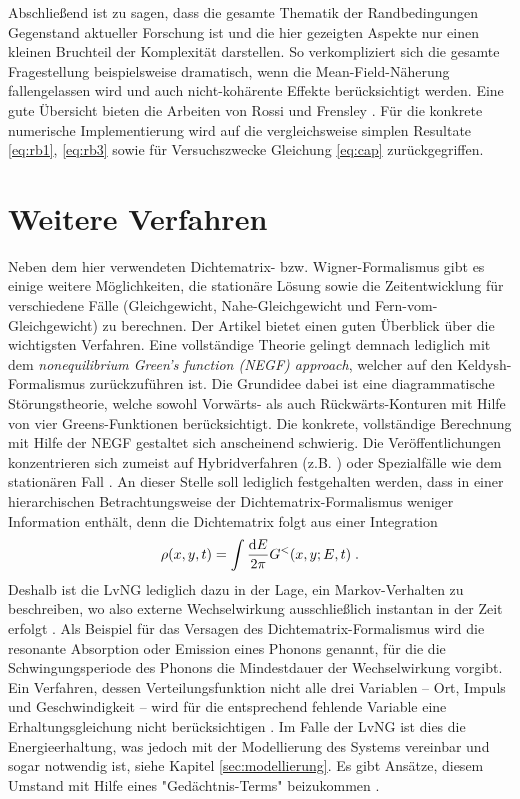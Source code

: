 Abschließend ist zu sagen, dass die gesamte Thematik der Randbedingungen Gegenstand aktueller Forschung ist und die hier gezeigten Aspekte nur einen kleinen Bruchteil der Komplexität darstellen. So verkompliziert sich die gesamte Fragestellung beispielsweise dramatisch, wenn die Mean-Field-Näherung fallengelassen wird und auch nicht-kohärente Effekte berücksichtigt werden. Eine gute Übersicht bieten die Arbeiten von Rossi \cite{buchRossi} und Frensley \cite{frensley}. Für die konkrete numerische Implementierung wird auf die vergleichsweise simplen Resultate \eqref{eq:rb1}, \eqref{eq:rb3} sowie für Versuchszwecke Gleichung \eqref{eq:cap} zurückgegriffen.

\section{Weitere Verfahren}\label{sec:weitere_verfahren}
Neben dem hier verwendeten Dichtematrix- bzw. Wigner-Formalismus gibt es einige weitere Möglichkeiten, die stationäre Lösung sowie die Zeitentwicklung für verschiedene Fälle (Gleichgewicht, Nahe-Gleichgewicht und Fern-vom-Gleichgewicht) zu berechnen. Der Artikel \cite{frensley3} bietet einen guten Überblick über die wichtigsten Verfahren. Eine vollständige Theorie gelingt demnach lediglich mit dem \emph{nonequilibrium Green's function (NEGF) approach}, welcher auf den Keldysh-Formalismus zurückzuführen ist. Die Grundidee dabei ist eine diagrammatische Störungstheorie, welche sowohl Vorwärts- als auch Rückwärts-Konturen mit Hilfe von vier Greens-Funktionen berücksichtigt. Die konkrete, vollständige Berechnung mit Hilfe der NEGF gestaltet sich anscheinend schwierig. Die Veröffentlichungen konzentrieren sich zumeist auf Hybridverfahren (z.B. \cite{memory2, negf-dft}) oder Spezialfälle wie dem stationären Fall \cite{negf_datta}.
An dieser Stelle soll lediglich festgehalten werden, dass in einer hierarchischen Betrachtungsweise der Dichtematrix-Formalismus weniger Information enthält, denn die Dichtematrix folgt aus einer Integration
\begin{equation*}
  \rho(x,y,t) = \int \frac{\mathop{}\!\mathrm{d} E}{2\pi}G^{<}(x,y;E,t) \; .
\end{equation*}
Deshalb ist die LvNG lediglich dazu in der Lage, ein Markov-Verhalten zu beschreiben, wo also externe Wechselwirkung ausschließlich instantan in der Zeit erfolgt \cite{frensley3}. Als Beispiel für das Versagen des Dichtematrix-Formalismus wird die resonante Absorption oder Emission eines Phonons genannt, für die die Schwingungsperiode des Phonons die Mindestdauer der Wechselwirkung vorgibt. Ein Verfahren, dessen Verteilungsfunktion nicht alle drei Variablen -- Ort, Impuls und Geschwindigkeit -- wird für die entsprechend fehlende Variable eine Erhaltungsgleichung nicht berücksichtigen \cite{frensley3}. Im Falle der LvNG ist dies die Energieerhaltung, was jedoch mit der Modellierung des Systems vereinbar und sogar notwendig ist, siehe Kapitel \ref{sec:modellierung}. Es gibt Ansätze, diesem Umstand mit Hilfe eines "Gedächtnis-Terms" beizukommen \cite{memory1, memory2}.

